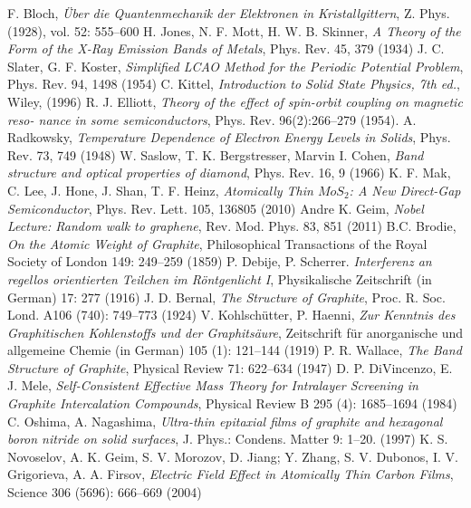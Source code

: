 \begin{thebibliography}{99}

 F. Bloch, \textit{Über die Quantenmechanik der Elektronen in Kristallgittern}, Z. Phys. (1928), vol. 52: 555–600
 H. Jones, N. F. Mott,  H. W. B. Skinner, \textit{A Theory of the Form of the X-Ray Emission Bands of Metals}, Phys. Rev. 45, 379 (1934)
 J. C. Slater, G. F. Koster, \textit{Simplified LCAO Method for the Periodic Potential Problem}, Phys. Rev. 94, 1498 (1954)
 C. Kittel, \textit{Introduction to Solid State Physics, 7th ed.}, Wiley, (1996) 
 R. J. Elliott, \textit{Theory of the effect of spin-orbit coupling on magnetic reso-
nance in some semiconductors}, Phys. Rev. 96(2):266–279 (1954).
 A. Radkowsky, \textit{Temperature Dependence of Electron Energy Levels in Solids}, Phys. Rev. 73, 749 (1948)
 W. Saslow, T. K. Bergstresser, Marvin I. Cohen, \textit{Band structure and optical properties of diamond}, Phys. Rev. 16, 9 (1966)
 K. F. Mak, C. Lee, J. Hone, J. Shan, T. F. Heinz, \textit{Atomically Thin $MoS_2$: A New Direct-Gap Semiconductor}, Phys. Rev. Lett. 105, 136805 (2010)
 Andre K. Geim, \textit{Nobel Lecture: Random walk to graphene}, Rev. Mod. Phys. 83, 851 (2011)
 B.C. Brodie, \textit{On the Atomic Weight of Graphite},  Philosophical Transactions of the Royal Society of London 149: 249–259 (1859)
 P. Debije, P. Scherrer. \textit{Interferenz an regellos orientierten Teilchen im Röntgenlicht I}, Physikalische Zeitschrift (in German) 17: 277 (1916)
 J. D. Bernal, \textit{The Structure of Graphite}, Proc. R. Soc. Lond. A106 (740): 749–773 (1924)
 V. Kohlschütter, P. Haenni, \textit{Zur Kenntnis des Graphitischen Kohlenstoffs und der Graphitsäure}, Zeitschrift für anorganische und allgemeine Chemie (in German) 105 (1): 121–144  (1919)
 P. R. Wallace, \textit{The Band Structure of Graphite}, Physical Review 71: 622–634 (1947)
 D. P. DiVincenzo, E. J. Mele, \textit{Self-Consistent Effective Mass Theory for Intralayer Screening in Graphite Intercalation Compounds}, Physical Review B 295 (4): 1685–1694 (1984)
 C. Oshima, A. Nagashima, \textit{Ultra-thin epitaxial films of graphite and hexagonal boron nitride on solid surfaces}, J. Phys.: Condens. Matter 9: 1–20. (1997)
 K. S. Novoselov, A. K. Geim, S. V. Morozov, D. Jiang; Y. Zhang, S. V. Dubonos, I. V. Grigorieva, A. A. Firsov, \textit{Electric Field Effect in Atomically Thin Carbon Films}, Science 306 (5696): 666–669 (2004)

\end{thebibliography}
